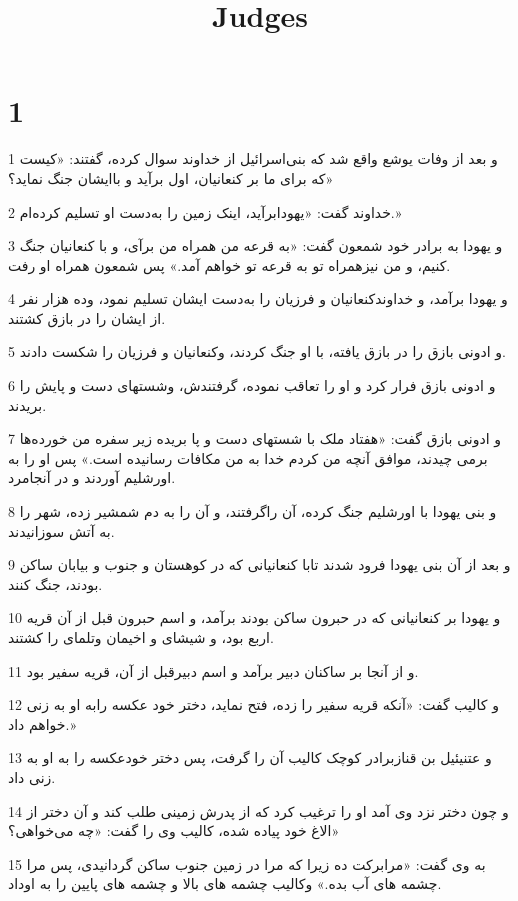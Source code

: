 

\title{Judges}

 
\chapter{1}

\par 1 و بعد از وفات یوشع واقع شد که بنی‌اسرائیل از خداوند سوال کرده، گفتند: «کیست که برای ما بر کنعانیان، اول برآید و باایشان جنگ نماید؟»
\par 2 خداوند گفت: «یهودابرآید، اینک زمین را به‌دست او تسلیم کرده‌ام.»
\par 3 و یهودا به برادر خود شمعون گفت: «به قرعه من همراه من برآی، و با کنعانیان جنگ کنیم، و من نیزهمراه تو به قرعه تو خواهم آمد.» پس شمعون همراه او رفت.
\par 4 و یهودا برآمد، و خداوندکنعانیان و فرزیان را به‌دست ایشان تسلیم نمود، وده هزار نفر از ایشان را در بازق کشتند.
\par 5 و ادونی بازق را در بازق یافته، با او جنگ کردند، وکنعانیان و فرزیان را شکست دادند.
\par 6 و ادونی بازق فرار کرد و او را تعاقب نموده، گرفتندش، وشستهای دست و پایش را بریدند.
\par 7 و ادونی بازق گفت: «هفتاد ملک با شستهای دست و پا بریده زیر سفره من خورده‌ها برمی چیدند، موافق آنچه من کردم خدا به من مکافات رسانیده است.» پس او را به اورشلیم آوردند و در آنجامرد.
\par 8 و بنی یهودا با اورشلیم جنگ کرده، آن راگرفتند، و آن را به دم شمشیر زده، شهر را به آتش سوزانیدند.
\par 9 و بعد از آن بنی یهودا فرود شدند تابا کنعانیانی که در کوهستان و جنوب و بیابان ساکن بودند، جنگ کنند.
\par 10 و یهودا بر کنعانیانی که در حبرون ساکن بودند برآمد، و اسم حبرون قبل از آن قریه اربع بود، و شیشای و اخیمان وتلمای را کشتند.
\par 11 و از آنجا بر ساکنان دبیر برآمد و اسم دبیرقبل از آن، قریه سفیر بود.
\par 12 و کالیب گفت: «آنکه قریه سفیر را زده، فتح نماید، دختر خود عکسه رابه او به زنی خواهم داد.»
\par 13 و عتنیئیل بن قنازبرادر کوچک کالیب آن را گرفت، پس دختر خودعکسه را به او به زنی داد.
\par 14 و چون دختر نزد وی آمد او را ترغیب کرد که از پدرش زمینی طلب کند و آن دختر از الاغ خود پیاده شده، کالیب وی را گفت: «چه می‌خواهی؟»
\par 15 به وی گفت: «مرابرکت ده زیرا که مرا در زمین جنوب ساکن گردانیدی، پس مرا چشمه های آب بده.» وکالیب چشمه های بالا و چشمه های پایین را به اوداد.

